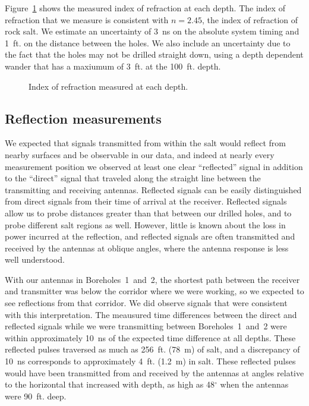 \documentclass{elsart}
\begin{document}
  Figure~\ref{fig:n} shows the measured index of refraction at each depth.  The index of refraction 
  that we measure is consistent with $n=2.45$, the index of refraction of rock salt.  We estimate 
  an uncertainty of 3~ns on the absolute system timing and 1~ft. on the distance between 
  the holes.  We also include an uncertainty due to the fact that the holes may not be 
  drilled straight down, using a depth dependent wander that has a maxiumum of 3~ft. 
  at the 100~ft. depth.
  
  \begin{figure}
    \caption{Index of refraction measured at each depth.}
    \label{fig:n}
  \end{figure}

  \subsection{Reflection measurements}
  
  We expected that signals transmitted from within the salt
  would reflect from nearby surfaces and be observable
  in our data, and indeed at nearly every measurement position we observed
  at least one clear ``reflected'' signal in addition to the 
  ``direct'' signal that traveled along the straight line between 
  the transmitting and receiving antennas.
  Reflected signals can be easily distinguished from direct signals
  from their time of arrival at the receiver.  Reflected signals allow
  us to probe distances greater than that between our drilled holes,
  and to probe different salt regions as well.  However,
  little is known about the loss in power incurred at the reflection, and
  reflected signals are often transmitted and received by the antennas at
  oblique angles, where the antenna response is less well understood.
  
  With our antennas in Boreholes~1~and~2, the shortest path between the
  receiver and transmitter was below the corridor
  where we were working, so we expected to
  see reflections from that corridor.  We did observe signals that
  were consistent with this interpretation.
  The meausured time differences
  between the direct and reflected signals while we were transmitting
  between Boreholes~1~and~2
  were within approximately 10~ns of the expected time
  difference at all depths.  These reflected pulses traversed as
  much as 256~ft. (78~m) of salt, and a discrepancy of 10~ns corresponds to
  approximately 4~ft. (1.2~m) in salt.  These reflected pulses would have been
  transmitted from and received by the antennas at angles relative to 
  the horizontal that increased with depth, as high as 48$^{\circ}$ when the
  antennas were 90~ft. deep.
\end{document}
